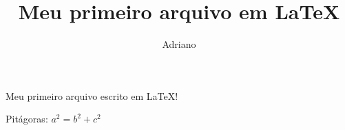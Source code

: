 \documentclass{article}
\author{Adriano}
\title{Meu primeiro arquivo em \LaTeX}
\begin{document}
\maketitle

Meu primeiro arquivo escrito em \LaTeX!

Pit\'{a}goras: $a^2=b^2+c^2$
\end{document}
